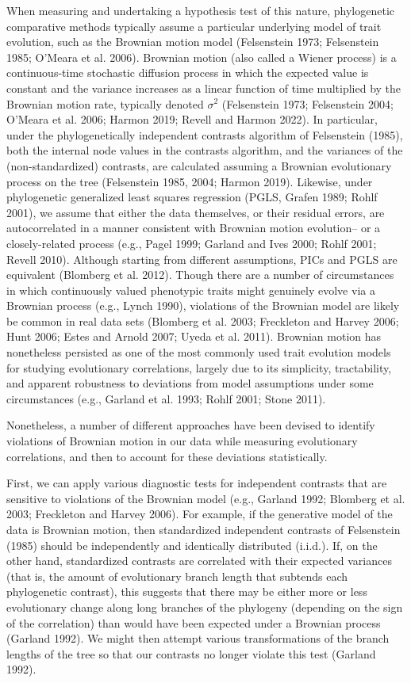 \documentclass[fleqn,10pt,lineno]{wlpeerj} %
\begin{document}
When measuring and undertaking a hypothesis test of this nature, phylogenetic comparative methods typically assume a particular underlying model of trait evolution, such as the Brownian motion model (Felsenstein 1973; Felsenstein 1985; O'Meara et al. 2006). Brownian motion (also called a Wiener process) is a continuous-time stochastic diffusion process in which the expected value is constant and the variance increases as a linear function of time multiplied by the Brownian motion rate, typically denoted \(\sigma^2\) (Felsenstein 1973; Felsenstein 2004; O'Meara et al. 2006; Harmon 2019; Revell and Harmon 2022). In particular, under the phylogenetically independent contrasts algorithm of Felsenstein (1985), both the internal node values in the contrasts algorithm, and the variances of the (non-standardized) contrasts, are calculated assuming a Brownian evolutionary process on the tree (Felsenstein 1985, 2004; Harmon 2019). Likewise, under phylogenetic generalized least squares regression (PGLS, Grafen 1989; Rohlf 2001), we assume that either the data themselves, or their residual errors, are autocorrelated in a manner consistent with Brownian motion evolution-- or a closely-related process (e.g., Pagel 1999; Garland and Ives 2000; Rohlf 2001; Revell 2010). Although starting from different assumptions, PICs and PGLS are equivalent (Blomberg et al. 2012). Though there are a number of circumstances in which continuously valued phenotypic traits might genuinely evolve via a Brownian process (e.g., Lynch 1990), violations of the Brownian model are likely be common in real data sets (Blomberg et al. 2003; Freckleton and Harvey 2006; Hunt 2006; Estes and Arnold 2007; Uyeda et al. 2011). Brownian motion has nonetheless persisted as one of the most commonly used trait evolution models for studying evolutionary correlations, largely due to its simplicity, tractability, and apparent robustness to deviations from model assumptions under some circumstances (e.g., Garland et al. 1993; Rohlf 2001; Stone 2011).

Nonetheless, a number of different approaches have been devised to identify violations of Brownian motion in our data while measuring evolutionary correlations, and then to account for these deviations statistically.

First, we can apply various diagnostic tests for independent contrasts that are sensitive to violations of the Brownian model (e.g., Garland 1992; Blomberg et al. 2003; Freckleton and Harvey 2006). For example, if the generative model of the data is Brownian motion, then standardized independent contrasts of Felsenstein (1985) should be independently and identically distributed (i.i.d.). If, on the other hand, standardized contrasts are correlated with their expected variances (that is, the amount of evolutionary branch length that subtends each phylogenetic contrast), this suggests that there may be either more or less evolutionary change along long branches of the phylogeny (depending on the sign of the correlation) than would have been expected under a Brownian process (Garland 1992). We might then attempt various transformations of the branch lengths of the tree so that our contrasts no longer violate this test (Garland 1992).
\end{document}
